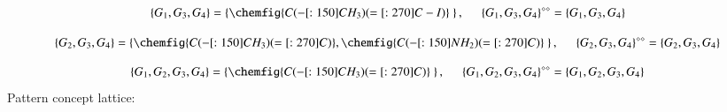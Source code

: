 \documentclass[12pt]{report}
\begin{document}
\begin{solution}
    
    \[
      \left\{G_1, G_3, G_4\right\} = \left\{\chemfig{C(-[:150]CH_3)(=[:270]C-I)}\ \right\}, \hspace*{0.5cm} \left\{G_1, G_3, G_4\right\}^{\diamond\diamond} = \left\{G_1, G_3, G_4\right\}
    \]


    \[
      \left\{G_2, G_3, G_4\right\} = \left\{\chemfig{C(-[:150]CH_3)(=[:270]C)}, \chemfig{C(-[:150]NH_2)(=[:270]C)}\ \right\}, \hspace*{0.5cm} \left\{G_2, G_3, G_4\right\}^{\diamond\diamond} = \left\{G_2, G_3, G_4\right\}
    \]

    
    \[
      \left\{G_1, G_2, G_3, G_4\right\} = \left\{\chemfig{C(-[:150]CH_3)(=[:270]C)}\ \right\}, \hspace*{0.5cm} \left\{G_1, G_2, G_3, G_4\right\}^{\diamond\diamond} = \left\{G_1, G_2, G_3, G_4\right\}
    \]
    Pattern concept lattice:
    \begin{figure}[H]
      \centering
      


\begin{tikzpicture}[x=0.75pt,y=0.75pt,yscale=-1,xscale=1]


\end{tikzpicture}
\end{figure}
\end{solution}
\end{document}
